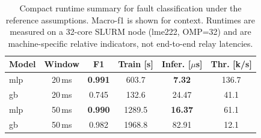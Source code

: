 \begin{table}[ht]
\caption{Compact runtime summary for fault classification under the reference assumptions. Macro-\ac{f1} is shown for context. Runtimes are measured on a 32-core SLURM node (lme222, OMP=32) and are machine-specific relative indicators, not end-to-end relay latencies.}
\label{tab:fc_runtime_compact}
\centering
\small
\begin{tabular}{lccccc}
\toprule
\textbf{Model} & \textbf{Window} & \textbf{F1} & \textbf{Train [s]} & \textbf{Infer. [$\mu$s]} & \textbf{Thr. [k/s]} \\
\midrule
\ac{mlp} & 20\,ms & \textbf{0.991} & 603.7 & \textbf{7.32} & 136.7 \\
\ac{gb} & 20\,ms & 0.745 & 132.6 & 24.47 & 41.1 \\
\midrule
\ac{mlp} & 50\,ms & \textbf{0.990} & 1289.5 & \textbf{16.37} & 61.1 \\
\ac{gb} & 50\,ms & 0.982 & 1968.8 & 82.91 & 12.1 \\
\bottomrule
\end{tabular}
\end{table}
